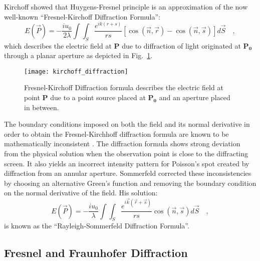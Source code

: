 Kirchoff \cite{kirchoff1883} showed that Huygens-Fresnel principle is an approximation of the now well-known ``Fresnel-Kirchoff Diffraction Formula'':
\begin{equation}
\label{eq:fresnel_kirchoff}
E(\vec{P}) = -\frac{iu_0}{2\lambda}\int \int _S \frac{e^{ik(r+s)}}{rs}\left[\cos (\vec{n},\vec{r}) - \cos (\vec{n},\vec{s})\right]d\vec{S} \quad ,
\end{equation}
which describes the electric field at \textbf{P} due to diffraction of light originated at $\mathbf{P_0}$ through a planar aperture as depicted in Fig.~\ref{fig:kirchoff_diffraction}.
\begin{figure}[t!]
  \centering
  \texttt{[image: kirchoff\_diffraction]}
  \caption{Fresnel-Kirchoff Diffraction formula describes the electric field at point $\mathbf{P}$ due to a point source placed at $\mathbf{P_0}$ and an aperture placed in between.}
  \label{fig:kirchoff_diffraction}
\end{figure}
The boundary conditions imposed on both the field and its normal derivative in order to obtain the Fresnel-Kirchhoff diffraction formula are known to be mathematically inconsistent \cite{Lucke_2006, Heurtley:73, Sommerfeld:1954:O}.  The diffraction formula shows strong deviation from the physical solution when the observation point is close to the diffracting screen. It also yields an incorrect intensity pattern for Poisson's spot created by diffraction from an annular aperture. Sommerfeld corrected these inconsistencies by choosing an alternative Green's function and removing the boundary condition on the normal derivative of the field. His solution:
\begin{equation}
\label{eq:rayleigh_sommerfeld}
E(\vec{P}) = -\frac{iu_0}{\lambda}\int \int _S \frac{e^{i\vec{k}(\vec{r}+\vec{s})}}{rs} \cos (\vec{n},\vec{s}) d\vec{S} \quad ,
\end{equation}
is known as the ``Rayleigh-Sommerfeld Diffraction Formula''.

\subsection{Fresnel and Fraunhofer Diffraction}

